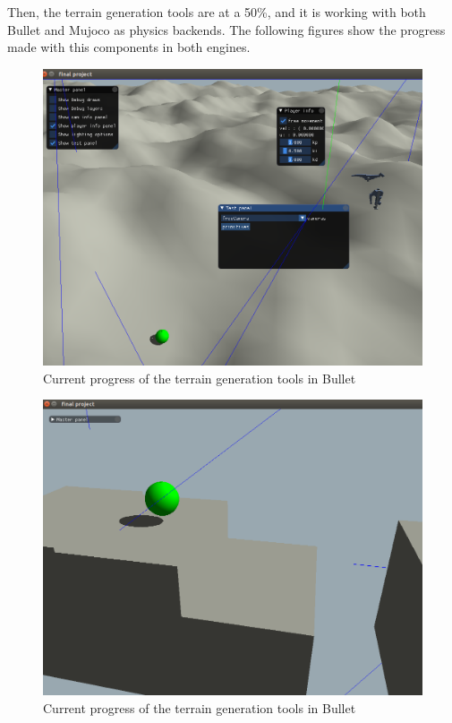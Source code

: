 Then, the terrain generation tools are at a 50\%, and it is working with both Bullet and Mujoco
as physics backends. The following figures show the progress made with this components in both
engines.

\begin{figure}
    \centering
    \includegraphics[width=6in]{./chapters/imgs/img_current_progress_terrain_generation_1.png}
    \caption[img_cp_terrain_generation_bullet_1]{Current progress of the terrain generation tools in Bullet}
    \label{fig:img_cp_terrain_generation_bullet_1}
\end{figure}

\begin{figure}
    \centering
    \includegraphics[width=6in]{./chapters/imgs/img_current_progress_terrain_generation_2.png}
    \caption[img_cp_terrain_generation_bullet_2]{Current progress of the terrain generation tools in Bullet}
    \label{fig:img_cp_terrain_generation_bullet_2}
\end{figure}

